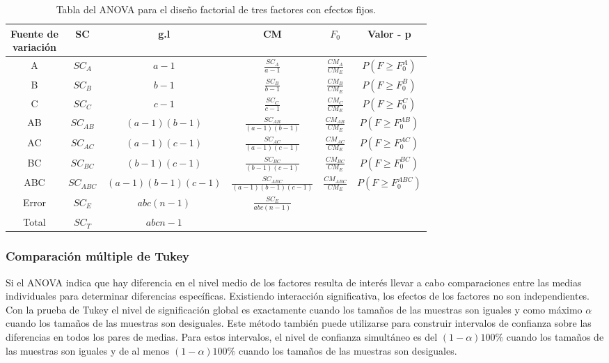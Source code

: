 \begin{table}
	\centering
	\begin{tabular}{|c|c|c|c|c|c|}
		\hline
		\makecell{Fuente de \\ variación} & SC & g.l & CM & $F_{0}$ & Valor - p \\ %
		\hline
		A & $SC_{A}$ & $a-1$ & $\frac{SC_{A}}{a-1}$ &  $\frac{CM_{A}}{CM_{E}}$ & $P(F \geq F_{0}^{A} )$ \\
		\hline
		B & $SC_{B}$ & $b-1$ & $\frac{SC_{B}}{b-1}$ &  $\frac{CM_{B}}{CM_{E}}$ & $P(F \geq F_{0}^{B} )$ \\
		\hline
		C & $SC_{C}$ & $c-1$ & $\frac{SC_{C}}{c-1}$ &  $\frac{CM_{C}}{CM_{E}}$ & $P(F \geq F_{0}^{C} )$ \\
		\hline
		AB & $SC_{AB}$ & $(a-1)(b-1)$ & $\frac{SC_{AB}}{(a-1)(b-1)}$ &  $\frac{CM_{AB}}{CM_{E}}$ & $P(F \geq F_{0}^{AB} )$ \\
		\hline
		AC & $SC_{AC}$ & $(a-1)(c-1)$ & $\frac{SC_{AC}}{(a-1)(c-1)}$ &  $\frac{CM_{AC}}{CM_{E}}$ & $P(F \geq F_{0}^{AC} )$ \\
		\hline
		BC & $SC_{BC}$ & $(b-1)(c-1) $ & $\frac{SC_{BC}}{(b-1)(c-1)}$ &  $\frac{CM_{BC}}{CM_{E}}$ & $P(F \geq F_{0}^{BC} )$ \\
		\hline
		ABC & $SC_{ABC}$ & $(a-1)(b-1)(c-1)$ & $\frac{SC_{ABC}}{(a-1)(b-1)(c-1)}$ &  $\frac{CM_{ABC}}{CM_{E}}$ & $P(F \geq F_{0}^{ABC} )$ \\
		\hline
		Error & $SC_{E} $ & $abc(n-1)$ & $\frac{SC_{E}}{abc(n-1)}$ & & \\
		\hline
		Total & $SC_{T}$ & $abcn-1$ & & &  \\
		\hline
	\end{tabular}
	\caption{Tabla del ANOVA para el diseño factorial de tres factores con efectos fijos.}
\end{table}
\FloatBarrier

\subsubsection{Comparación múltiple de Tukey}

Si el ANOVA indica que hay diferencia en el nivel medio de los factores resulta de interés llevar a cabo comparaciones entre las medias individuales para determinar diferencias específicas. Existiendo interacción significativa, los efectos de los factores no son independientes.\\


Con la prueba de Tukey el nivel de significación global es exactamente  cuando los tamaños de las muestras son iguales y como máximo $\alpha$ cuando los tamaños de las muestras son desiguales. Este método también puede utilizarse para construir intervalos de confianza sobre las diferencias en todos los pares de medias. Para estos intervalos, el nivel de confianza simultáneo es del $(1-\alpha)100\%$ cuando los tamaños de las muestras son iguales y de al menos $(1-\alpha)100\%$  cuando los tamaños de las muestras son desiguales.\\

